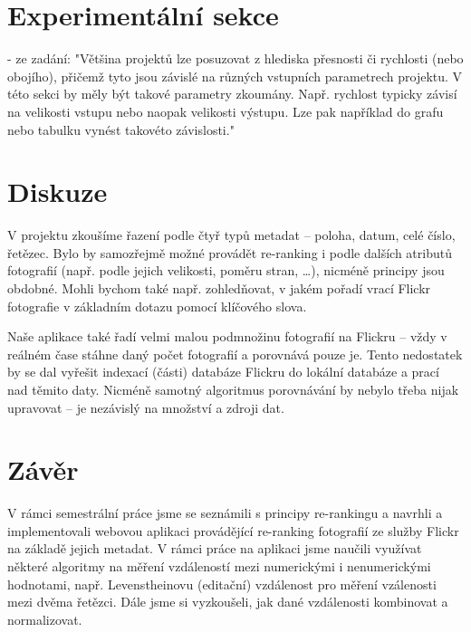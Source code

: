 \documentclass[12pt,oneside,a4paper]{article}
\begin{document}
\section{Experimentální sekce}
- ze zadání: "Většina projektů lze posuzovat z hlediska přesnosti či rychlosti (nebo obojího),
přičemž tyto jsou závislé na různých vstupních parametrech projektu. V této sekci by
měly být takové parametry zkoumány. Např. rychlost typicky závisí na velikosti
vstupu nebo naopak velikosti výstupu. Lze pak například do grafu nebo tabulku
vynést takovéto závislosti."

\section{Diskuze}

V projektu zkoušíme řazení podle čtyř typů metadat -- poloha, datum, celé číslo, řetězec. Bylo by samozřejmě možné provádět re-ranking i podle dalších atributů fotografií (např. podle jejich velikosti, poměru stran, \ldots), nicméně principy jsou obdobné. Mohli bychom také např. zohledňovat, v jakém pořadí vrací Flickr fotografie v základním dotazu pomocí klíčového slova.

Naše aplikace také řadí velmi malou podmnožinu fotografií na Flickru -- vždy v reálném čase stáhne daný počet fotografií a porovnává pouze je. Tento nedostatek by se dal vyřešit indexací (části) databáze Flickru do lokální databáze a prací nad těmito daty. Nicméně samotný algoritmus porovnávání by nebylo třeba nijak upravovat -- je nezávislý na množství a zdroji dat.



\section{Závěr}
V rámci semestrální práce jsme se seznámili s principy re-rankingu a navrhli a implementovali webovou aplikaci provádějící re-ranking fotografií ze služby Flickr na základě jejich metadat. V rámci práce na aplikaci jsme naučili využívat některé algoritmy na měření vzdáleností mezi numerickými i nenumerickými hodnotami, např. Levenstheinovu (editační) vzdálenost pro měření vzálenosti mezi dvěma řetězci. Dále jsme si vyzkoušeli, jak dané vzdálenosti kombinovat a normalizovat.
\end{document}
